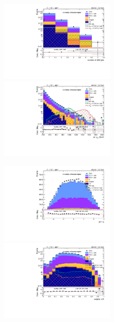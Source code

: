 \begin{figure}[!htb]
  \begin{center}
    \includegraphics[width=0.495\textwidth]{plots/v9_thesis/XVZnnlpSB/nFatJets.pdf}  
    \includegraphics[width=0.495\textwidth]{plots/v9_thesis/XVZnnlpSB/FatJet1_pt.pdf}
    
    \includegraphics[width=0.495\textwidth]{plots/v9_thesis/XVZnnlpSB/FatJet1_eta.pdf}
    \includegraphics[width=0.495\textwidth]{plots/v9_thesis/XVZnnlpSB/FatJet1_dR.pdf}


\end{center}
\end{figure}
